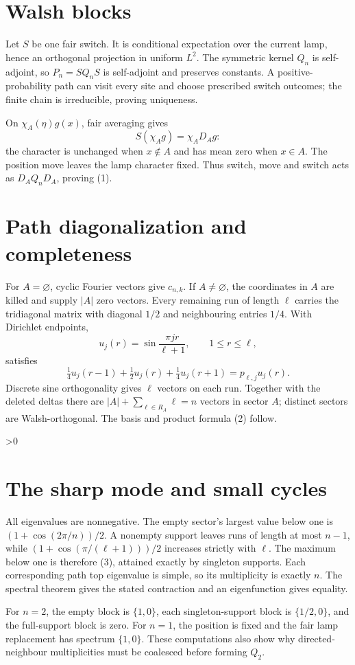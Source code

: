 \documentclass[10pt]{article}
\newcommand{\1}{\mathbf 1}
\providecommand{\CRevisionRound}{2}
\begin{document}
\section{Walsh blocks}
Let $S$ be one fair switch.  It is conditional expectation over the current
lamp, hence an orthogonal projection in uniform $L^2$.  The symmetric kernel
$Q_n$ is self-adjoint, so $P_n=SQ_nS$ is self-adjoint and preserves constants.
A positive-probability path can visit every site and choose prescribed switch
outcomes; the finite chain is irreducible, proving uniqueness.

On $\chi_A(\eta)g(x)$, fair averaging gives
\[
S(\chi_Ag)=\chi_AD_Ag:
\]
the character is unchanged when $x\notin A$ and has mean zero when $x\in A$.
The position move leaves the lamp character fixed.  Thus switch, move and
switch acts as $D_AQ_nD_A$, proving (1).

\section{Path diagonalization and completeness}
For $A=\varnothing$, cyclic Fourier vectors give $c_{n,k}$.  If
$A\ne\varnothing$, the coordinates in $A$ are killed and supply $|A|$ zero
vectors.  Every remaining run of length $\ell$ carries the tridiagonal matrix
with diagonal $1/2$ and neighbouring entries $1/4$.  With Dirichlet endpoints,
\[
u_j(r)=\sin\frac{\pi jr}{\ell+1},\qquad 1\le r\le\ell,
\]
satisfies
\[
\tfrac14u_j(r-1)+\tfrac12u_j(r)+\tfrac14u_j(r+1)
=p_{\ell,j}u_j(r).
\]
Discrete sine orthogonality gives $\ell$ vectors on each run.  Together with
the deleted deltas there are $|A|+\sum_{\ell\in R_A}\ell=n$ vectors in sector
$A$; distinct sectors are Walsh-orthogonal.  The basis and product formula
(2) follow.

\ifnum\CRevisionRound>0
\section{The sharp mode and small cycles}
All eigenvalues are nonnegative.  The empty sector's largest value below one
is $(1+\cos(2\pi/n))/2$.  A nonempty support leaves runs of length at most
$n-1$, while $(1+\cos(\pi/(\ell+1)))/2$ increases strictly with $\ell$.
The maximum below one is therefore (3), attained exactly by singleton supports.
Each corresponding path top eigenvalue is simple, so its multiplicity is
exactly $n$.  The spectral theorem gives the stated contraction and an
eigenfunction gives equality.

For $n=2$, the empty block is $\{1,0\}$, each singleton-support block is
$\{1/2,0\}$, and the full-support block is zero.  For $n=1$, the position is
fixed and the fair lamp replacement has spectrum $\{1,0\}$.  These computations
also show why directed-neighbour multiplicities must be coalesced before
forming $Q_2$.
\end{document}
